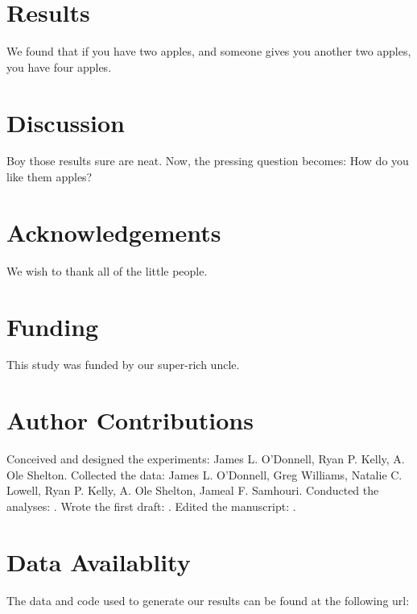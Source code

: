 \documentclass[11pt,letterpaper]{article} %
\begin{document}
\section*{Results}
We found that if you have two apples, and someone gives you another two apples, you have four apples.

\section*{Discussion}
Boy those results sure are neat. Now, the pressing question becomes: How do you like them apples?

\section*{Acknowledgements}
We wish to thank all of the little people.

\section*{Funding}
This study was funded by our super-rich uncle.

\section*{Author Contributions}
Conceived and designed the experiments: James L. O'Donnell, Ryan P. Kelly, A. Ole Shelton.
Collected the data: James L. O'Donnell, Greg Williams, Natalie C. Lowell, Ryan P. Kelly, A. Ole Shelton, Jameal F. Samhouri.
Conducted the analyses: .
Wrote the first draft: .
Edited the manuscript: .


\section*{Data Availablity}
The data and code used to generate our results can be found at the following url: 
\end{document}
